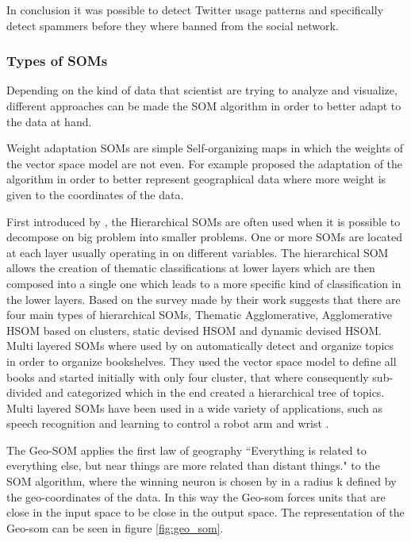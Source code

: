 In conclusion it was possible to detect Twitter usage patterns and specifically detect spammers before they where banned from the social network. 

\subsubsection{Types of SOMs} %
\label{ssub:types_of_soms}

Depending on the kind of data that scientist are trying to analyze and visualize, different approaches can be made the SOM algorithm in order to better adapt to the data at hand.

Weight adaptation SOMs are simple Self-organizing maps in which the weights of the vector space model are not even. For example \citet{Bacao2005}  proposed the adaptation of the algorithm in order to better represent geographical data where more weight is given to the coordinates of the data.

First introduced by \citet{multi_layer_semantics}, the Hierarchical SOMs are often used when it is possible to decompose on big problem into smaller problems. One or more SOMs are located at each layer usually operating in on different variables. The hierarchical SOM allows the creation of thematic classifications at lower layers which are then composed into a single one \citet{Bacao2005} which leads to a more specific kind of classification in the lower layers. 
Based on the survey made by their work \citet{Henriques2012} suggests that there are four main types of hierarchical SOMs, Thematic Agglomerative, Agglomerative HSOM based on clusters, static devised HSOM and dynamic devised HSOM.
Multi layered SOMs where used by \citet{Rauber2000} on automatically detect and organize topics in order to organize bookshelves. They used the vector space model to define all books and started initially with only four cluster, that where consequently sub-divided and categorized which in the end created a hierarchical tree of topics.
Multi layered SOMs have been used in a wide variety of applications, such as speech recognition \citet{multi_layer_semantics} and learning to control a robot arm and wrist \citet{Sayers1991}.


The Geo-SOM \citet{Bacao2005} applies the first law of geography “Everything is related to everything else, but near things are more related than distant things." to the SOM algorithm, where the winning neuron is chosen by in a radius k defined by the geo-coordinates of the data. In this way the Geo-som forces units that are close in the input space to be close in the output space. The representation of the Geo-som can be seen in figure \ref{fig:geo_som}.



